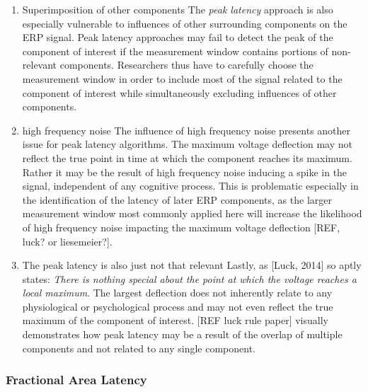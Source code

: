 \documentclass[
  man,floatsintext]{apa7}
\begin{document}
\begin{enumerate}
\def\labelenumi{\arabic{enumi}.}
\setcounter{enumi}{1}
\item
  Superimposition of other components
  The \emph{peak latency} approach is also especially vulnerable to influences of other surrounding components on the ERP signal. Peak latency approaches may fail to detect the peak of the component of interest if the measurement window contains portions of non-relevant components. Researchers thus have to carefully choose the measurement window in order to include most of the signal related to the component of interest while simultaneously excluding influences of other components.
\item
  high frequency noise
  The influence of high frequency noise presents another issue for peak latency algorithms. The maximum voltage deflection may not reflect the true point in time at which the component reaches its maximum. Rather it may be the result of high frequency noise inducing a spike in the signal, independent of any cognitive process. This is problematic especially in the identification of the latency of later ERP components, as the larger measurement window most commonly applied here will increase the likelihood of high frequency noise impacting the maximum voltage deflection {[}REF, luck? or liesemeier?{]}.
\item
  The peak latency is also just not that relevant
  Lastly, as {[}Luck, 2014{]} so aptly states: \emph{There is nothing special about the point at which the voltage reaches a local maximum}. The largest deflection does not inherently relate to any physiological or psychological process and may not even reflect the true maximum of the component of interest. {[}REF luck rule paper{]} visually demonstrates how peak latency may be a result of the overlap of multiple components and not related to any single component.
\end{enumerate}

\hypertarget{fractional-area-latency}{%
\subsubsection{Fractional Area Latency}\label{fractional-area-latency}}
\end{document}
